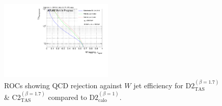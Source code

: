 \begin{figure}[h]
\includegraphics[width=0.48\textwidth]{sascha_input/Appendix/W_best/ROC_ALL_h_recoJet_D2_bin6.pdf}
\caption{{ROCs showing QCD rejection against $W$ jet efficiency for $\text{D2}_{\text{TAS}}^{(\beta=1.7)}$ \& $\text{C2}_{\text{TAS}}^{(\beta=1.7)}$ compared to $\text{D2}_{\text{calo}}^{(\beta=1)}$. }}
\end{figure}\label{fig:ROC_best_w}


